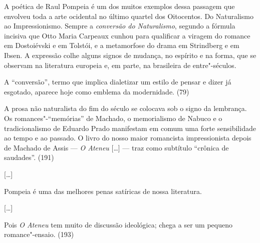 
\smallskip

A poética de Raul Pompeia é um dos muitos exemplos dessa
passagem que envolveu toda a arte ocidental no último quartel dos
Oitocentos. Do Naturalismo ao Impressionismo. Sempre a
\textit{conversão do Naturalismo}, segundo a
fórmula incisiva que Otto Maria Carpeaux cunhou para qualificar a
viragem do romance em Dostoiévski e em Tolstói, e a metamorfose do
drama em Strindberg e em Ibsen. A expressão colhe alguns signos de
mudança, no espírito e na forma, que se observam na literatura europeia
e, em parte, na brasileira de entre"-séculos.

A ``conversão'', termo que implica dialetizar um estilo de pensar e dizer
já esgotado, aparece hoje como emblema da modernidade. (79)



A prosa não naturalista do fim do século se colocava
sob o signo da lembrança. Os romances"-``memórias'' de Machado, o
memorialismo de Nabuco e o tradicionalismo de Eduardo Prado manifestam
em comum uma forte sensibilidade ao tempo e ao passado. O livro do
nosso maior romancista impressionista depois de Machado de Assis --- 
\textit{O Ateneu} [\ldots] --- traz como subtítulo ``crônica de saudades''. (191)

[\ldots]

Pompeia é uma das melhores penas satíricas de nossa literatura.

[\ldots]

Pois \textit{O Ateneu} tem muito de discussão ideológica; 
chega a ser um pequeno romance"-ensaio.
(193) 



